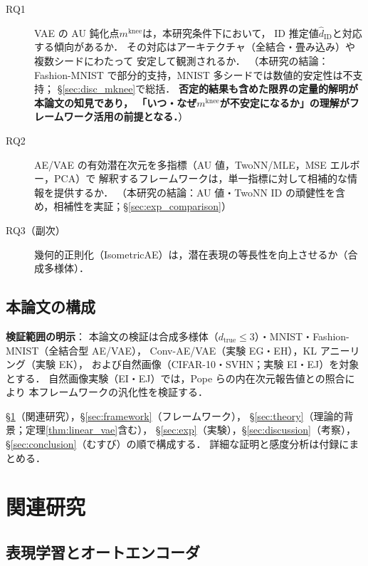 \documentclass[11pt,a4paper]{jsarticle}
\newcommand{\mknee}{m^{\mathrm{knee}}}
\begin{document}
\begin{description}
  \item[RQ1] VAE の AU 鈍化点$\mknee$は，本研究条件下において，
             ID 推定値$\hat{d}_\mathrm{ID}$と対応する傾向があるか．
             その対応はアーキテクチャ（全結合・畳み込み）や複数シードにわたって
             安定して観測されるか．
             （本研究の結論：Fashion-MNIST で部分的支持，MNIST 多シードでは数値的安定性は不支持；
             §\ref{sec:disc_mknee}で総括．
             \textbf{否定的結果も含めた限界の定量的解明が本論文の知見であり，
             「いつ・なぜ$\mknee$が不安定になるか」の理解がフレームワーク活用の前提となる．}）
  \item[RQ2] AE/VAE の有効潜在次元を多指標（AU 値，TwoNN/MLE，MSE エルボー，PCA）で
             解釈するフレームワークは，単一指標に対して相補的な情報を提供するか．
             （本研究の結論：AU 値・TwoNN ID の頑健性を含め，相補性を実証；§\ref{sec:exp_comparison}）
  \item[RQ3（副次）] 幾何的正則化（IsometricAE）は，潜在表現の等長性を向上させるか（合成多様体）．
\end{description}

\subsection{本論文の構成}\label{sec:intro_structure}

\textbf{検証範囲の明示}：
本論文の検証は合成多様体（$d_{\mathrm{true}} \leq 3$）・MNIST・Fashion-MNIST（全結合型 AE/VAE），
Conv-AE/VAE（実験 EG・EH），KL アニーリング（実験 EK），
および自然画像（CIFAR-10・SVHN；実験 EI・EJ）を対象とする．
自然画像実験（EI・EJ）では，Pope ら\cite{pope2021intrinsic}の内在次元報告値との照合により
本フレームワークの汎化性を検証する．

§\ref{sec:related}（関連研究），§\ref{sec:framework}（フレームワーク），
§\ref{sec:theory}（理論的背景；定理\ref{thm:linear_vae}含む），
§\ref{sec:exp}（実験），§\ref{sec:discussion}（考察），§\ref{sec:conclusion}（むすび）の順で構成する．
詳細な証明と感度分析は付録にまとめる．

\section{関連研究}\label{sec:related}

\subsection{表現学習とオートエンコーダ}\label{sec:related_ae}
\end{document}
